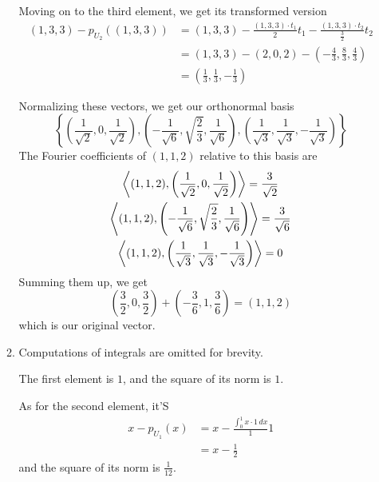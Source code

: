 \documentclass[12pt]{article}
\begin{document}
\begin{enumerate}
\begin{enumerate}
                        Moving on to the third element, we get its transformed version
                        \begin{align*}
                              (1, 3, 3) - p_{U_2}((1, 3, 3)) & = (1, 3, 3) - \frac{(1, 3, 3) \cdot t_1}{2}t_1 - \frac{(1, 3, 3) \cdot t_2}{\frac{3}{2}}t_2 \\
                                                             & = (1, 3, 3) - (2, 0, 2) - \left(-\frac{4}{3}, \frac{8}{3}, \frac{4}{3}\right)               \\
                                                             & = \left(\frac{1}{3}, \frac{1}{3}, -\frac{1}{3}\right)
                        \end{align*}

                        Normalizing these vectors, we get our orthonormal basis
                        \[\left\{\left(\frac{1}{\sqrt{2}}, 0, \frac{1}{\sqrt{2}}\right),
                              \left(-\frac{1}{\sqrt{6}}, \sqrt{\frac{2}{3}}, \frac{1}{\sqrt{6}}\right),
                              \left(\frac{1}{\sqrt{3}}, \frac{1}{\sqrt{3}}, -\frac{1}{\sqrt{3}}\right)\right\}\]
                        The Fourier coefficients of $(1, 1, 2)$ relative to this basis are
                        \begin{gather*}
                              \Braket{(1, 1, 2), \left(\frac{1}{\sqrt{2}}, 0, \frac{1}{\sqrt{2}}\right)}=\frac{3}{\sqrt{2}} \\
                              \Braket{(1, 1, 2), \left(-\frac{1}{\sqrt{6}}, \sqrt{\frac{2}{3}}, \frac{1}{\sqrt{6}}\right)}=\frac{3}{\sqrt{6}} \\
                              \Braket{(1, 1, 2), \left(\frac{1}{\sqrt{3}}, \frac{1}{\sqrt{3}}, -\frac{1}{\sqrt{3}}\right)}=0
                        \end{gather*}
                        Summing them up, we get
                        \[\left(\frac{3}{2}, 0, \frac{3}{2}\right)+\left(-\frac{3}{6}, 1, \frac{3}{6}\right)=(1, 1, 2)\]
                        which is our original vector.

                        \setcounter{enumii}{2}
                  \item Computations of integrals are omitted for brevity.

                        The first element is $1$, and the square of its norm is $1$.

                        As for the second element, it'S
                        \begin{align*}
                              x-p_{U_1}(x) & = x-\frac{\int_0^1 x \cdot 1\,dx}{1}1 \\
                                           & = x-\frac{1}{2}
                        \end{align*}
                        and the square of its norm is $\frac{1}{12}$.


\end{enumerate}
\end{enumerate}
\end{document}
